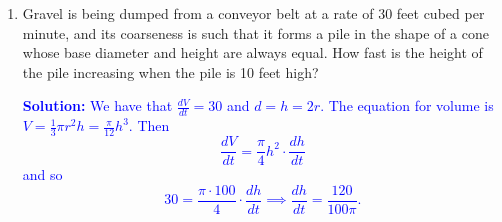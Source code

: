 \documentclass[letterpaper,11pt]{article}
\def\ds{\displaystyle}
\newcommand{\sol}[2]{\begin{minipage}[c][#1]{\linewidth}{\textcolor{blue}{\textbf{Solution:}}\quad \textcolor{blue}{#2}}\end{minipage}}
\newcommand{\sol}[2]{\begin{minipage}[c][#1]{\linewidth}{\vfill}\end{minipage}}
\begin{document}
\begin{enumerate}
\begin{enumerate}
\sol{.8 in}{$\ds \frac{dV}{dt} = 4 \pi \cdot 20^2 \cdot -3 \left(\frac{\text{cm}^3}{\text{min}}\right)$}

\end{enumerate}
\newpage

\item Gravel is being dumped from a conveyor belt at a rate of 30 feet cubed per minute, and its coarseness is such that it forms a pile in the shape of a cone whose base diameter and height are always equal. How fast is the height of the pile increasing when the pile is 10 feet high?

\sol{}{
We have that $\frac{dV}{dt} = 30$ and $d = h = 2r$. The equation for volume is $V = \frac{1}{3} \pi r^2 h = \frac{\pi}{12} h^3$. Then
\[\frac{dV}{dt} = \frac{\pi}{4} h^2 \cdot \frac{dh}{dt}\]
and so
\[30 = \frac{\pi\cdot 100}{4} \cdot \frac{dh}{dt}\implies \frac{dh}{dt} = \frac{120}{100\pi}.\]
}

\end{enumerate}
\end{document}
